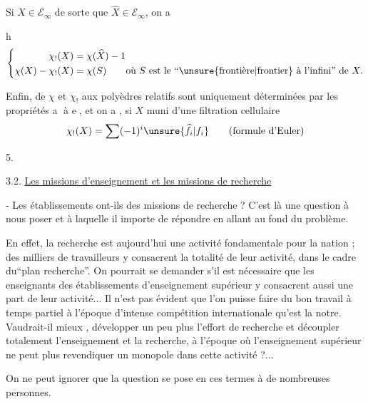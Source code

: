 Si  $X\in\mathcal E_\infty$ de sorte que $\widehat X\in\mathcal E_\infty$, on a

\textcircled{h}
\[
\left\{\begin{aligned}
\chi_!(X)&=\chi(\widehat X)-1\\
\chi(X)-\chi_!(X)&=\chi(S)\qquad\text{où }S\text{ est le ``}\unsure{\text{frontière}|\text{frontier}}\text{ à l'infini'' de }X.
\end{aligned}\right.
\]

Enfin,  de  $\chi$ et $\chi_!$ aux polyèdres relatifs sont uniquement déterminées par les propriétés \textcircled{a} à \textcircled{e}, et on a , si $X$ muni d'une filtration cellulaire
\[
\chi_!(X)=\sum(-1)^i\unsure{\widehat f_i|f_i}\qquad\text{(formule d'Euler)}
\]


\begin{flushright}5.\end{flushright}

3.2. \uline{Les missions d'enseignement et les missions de recherche}

- Les établissements ont-ils des missions de recherche ? C'est là une question à nous poser et à laquelle il importe de répondre en allant au fond du problème.

En effet, la recherche est aujourd'hui une activité fondamentale pour la nation ; des milliers de travailleurs y consacrent la totalité de leur activité, dans le cadre du``plan recherche''. On pourrait se demander s'il est nécessaire que les enseignants des établissements d'enseignement supérieur y consacrent aussi une part de leur activité... Il n'est pas évident que l'on puisse faire du bon travail à temps partiel à l'époque d'intense compétition internationale qu'est la notre. Vaudrait-il mieux , développer un peu plus l'effort de recherche et découpler totalement l'enseignement et la recherche, à l'époque où l'enseignement supérieur ne peut plus revendiquer un monopole dans cette activité ?...

On ne peut ignorer que la question se pose en ces termes à de nombreuses personnes.

